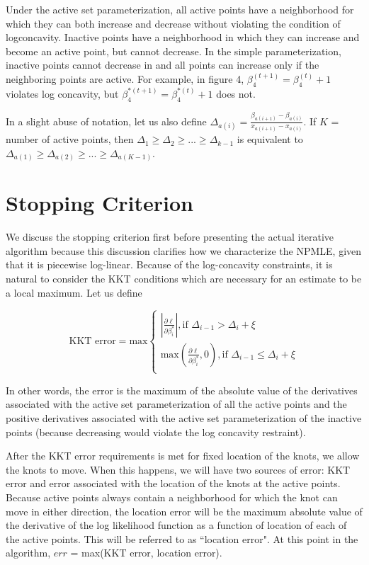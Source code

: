 	Under the active set parameterization, all active points have a neighborhood for which they can both increase and decrease without violating the condition of logconcavity. Inactive points have a neighborhood in which they can increase and become an active point, but cannot decrease. In the simple parameterization, inactive points cannot decrease in and all points can increase only if the neighboring points are active. For example, in figure 4, $\beta_4^{(t + 1)} = \beta_4^{(t)} + 1$ violates log concavity, but $\beta_4^{*(t+1)} = \beta_4^{*(t)} + 1$ does not. 
	
	In a slight abuse of notation, let us also define $\Delta_{a(i)} = \frac{\beta_{a(i + 1)} - \beta_{a(i)} } {x_{a(i + 1)} - x_{a(i)} }$. If $K$ = number of active points, then $\Delta_1 \geq \Delta_2 \geq ... \geq \Delta_{k-1}$ is equivalent to $\Delta_{a(1)} \geq \Delta_{a(2)} \geq ... \geq \Delta_{a(K-1)}$. 

			
	{\section{Stopping Criterion} } 
	\label{sec:4}
	
	We discuss the stopping criterion first before presenting the actual iterative algorithm because this discussion clarifies how we characterize the NPMLE, given that it is piecewise log-linear.  Because of the log-concavity constraints, it is natural to consider the KKT conditions \cite{RefKKT1951} which are necessary for an estimate to be a local maximum. Let us define
	
	\[
	\textrm{KKT error} = {\textrm{max}} 
	\begin{cases}
		|\frac{\partial \ell } {\partial \beta_i^*}|,  \textrm{if } \Delta_{i-1} > \Delta_{i} + \xi \\
		\textrm{max}(\frac{\partial \ell}{\partial \beta_i^*},0 ) ,  \textrm{if } \Delta_{i-1} \leq \Delta_i + \xi \\  
	\end{cases}
	\]
	
	In other words, the error is the maximum of the absolute value of the derivatives associated with the active set parameterization of all the active points and the positive derivatives associated with the active set parameterization of the inactive points (because decreasing would violate the log concavity restraint). 
	
	After the KKT error requirements is met for fixed location of the knots, we allow the knots to move. When this happens, we will have two sources of error: KKT error and error associated with the location of the knots at the active points. Because active points always contain a neighborhood for which the knot can move in either direction, the location error will be the maximum absolute value of the derivative of the log likelihood function as a function of location of each of the active points. This will be referred to as ``location error". At this point in the algorithm, $err$ = max(KKT error, location error). 
	
